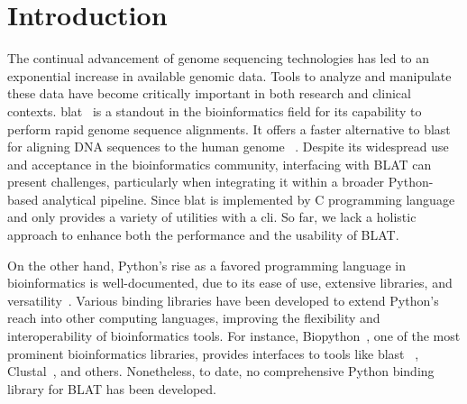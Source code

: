 






\section*{Introduction}\label{sec:introduction}

The continual advancement of genome sequencing technologies has led to an exponential increase in available genomic data.
Tools to analyze and manipulate these data have become critically important in both research and clinical contexts.
\acrfull{blat}~\citep{kent2002blat} is a standout in the bioinformatics field for its capability to perform rapid genome sequence alignments.
It offers a faster alternative to \acrfull{blast}~\citep{altschul1990basic}  for aligning DNA sequences to the human genome ~\citep{kent2002blat}.
Despite its widespread use and acceptance in the bioinformatics community, interfacing with BLAT can present challenges, particularly when integrating it within a broader Python-based analytical pipeline.
Since \acrshort{blat} is implemented by C programming language and only provides a variety of utilities with a \acrfull{cli}.
So far, we lack a holistic approach to enhance both the performance and the usability of BLAT.

On the other hand, Python's rise as a favored programming language in bioinformatics is well-documented, due to its ease of use, extensive libraries, and versatility~\citep{perkel2015programming}.
Various binding libraries have been developed to extend Python's reach into other computing languages, improving the flexibility and interoperability of bioinformatics tools.
For instance, Biopython~\citep{cock2009biopython}, one of the most prominent bioinformatics libraries, provides interfaces to tools like \acrshort{blast} ~\citep{altschul1990basic}, Clustal~\citep{higgins1988clustal}, and others.
Nonetheless, to date, no comprehensive Python binding library for BLAT has been developed.

